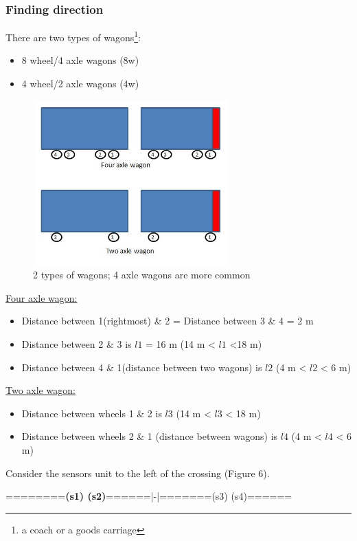 \documentclass[aps,letterpaper,11pt]{article}
\begin{document}
\subsubsection{Finding direction}
There are two types of wagons\footnote{a coach or a goods carriage}:
\begin{itemize}
\item 8 wheel/4 axle wagons (8w)
\item 4 wheel/2 axle wagons (4w)
\end{itemize}
\begin{figure}[H]
\begin{center}
\includegraphics[height = 2.5in,width=3in,angle=00]{figures/wagonTypes.JPG}
\caption{\small 2 types of wagons; 4 axle wagons are more common}
\end{center}
\end{figure}
\underline{Four axle wagon:}
\begin{itemize}
\item Distance between 1(rightmost) \& 2 = Distance between 3 \& 4 = 2 m
\item Distance between 2 \& 3 is $l1$ = 16 m (14 m < $l1$ <18 m)
\item Distance between 4 \& 1(distance between two wagons) is $l2$ (4 m < $l2$
< 6 m)
\end{itemize}
\underline{Two axle wagon:}
\begin{itemize}
\item Distance between wheels 1 \& 2 is $l3$ (14 m < $l3$ < 18 m)
\item Distance between wheels 2 \& 1 (distance between wagons) is $l4$ (4 m <
$l4$ < 6 m)
\end{itemize}
\newpage
Consider the sensors unit to the left of the crossing (Figure 6). \\
\begin{center}
========\textbf{(s1) (s2)}======|-|=======(s3) (s4)======
\end{center}
\end{document}

